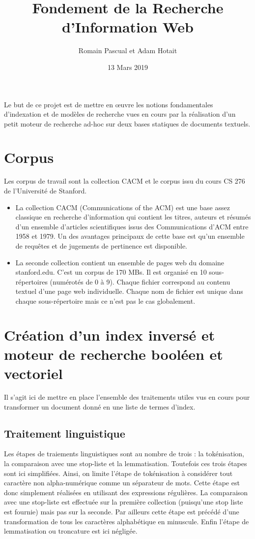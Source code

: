 \documentclass[12pt,a4paper]{article}
\author{Romain Pascual et Adam Hotait}
\date{13 Mars 2019}
\title{Fondement de la Recherche d'Information Web}
\begin{document}
\maketitle

Le but de ce projet est de mettre en \oe{}uvre les notions fondamentales d’indexation et de modèles de recherche vues en cours par la réalisation d’un petit moteur de recherche ad-hoc sur deux bases statiques de documents textuels.

\section{Corpus}
Les corpus de travail sont la collection CACM et le corpus issu du cours CS 276 de
l’Université de Stanford.
\begin{itemize}
\item La collection CACM (Communications of the ACM) est une base assez classique en recherche d’information qui contient les titres, auteurs et résumés d’un ensemble d’articles scientifiques issus des Communications d’ACM entre 1958 et 1979. Un des avantages principaux de cette base est qu’un ensemble de requêtes et de jugements de pertinence est disponible. 
\item La seconde collection contient un ensemble de pages web du domaine stanford.edu. C’est un corpus de 170 MBs. Il est organisé en 10 sous-répertoires (numérotés de 0 à 9). Chaque fichier correspond au contenu textuel d’une page web individuelle. Chaque nom de fichier est unique dans chaque sous-répertoire mais ce n’est pas le cas globalement.
\end{itemize}

\section{Création d’un index inversé et moteur de recherche booléen et vectoriel}

Il s’agit ici de mettre en place l’ensemble des traitements utiles vus en cours pour transformer un document
donné en une liste de termes d’index.

\subsection{Traitement linguistique}
Les étapes de traiements linguistiques sont au nombre de trois : la tokénisation, la comparaison avec une stop-liste et la lemmatisation. Toutefois ces trois étapes sont ici simplifiées. Ainsi, on limite l'étape de tokénisation à considérer tout caractère non alpha-numérique comme un séparateur de mots. Cette étape est donc simplement réalisées en utilisant des expressions régulières. La comparaison avec une stop-liste est effectuée sur la première collection (puisqu'une stop liste est fournie) mais pas sur la seconde. Par ailleurs cette étape est précédé d'une transformation de tous les caractères alphabétique en minuscule. Enfin l'étape de lemmatisation ou troncature est ici négligée.
\end{document}
